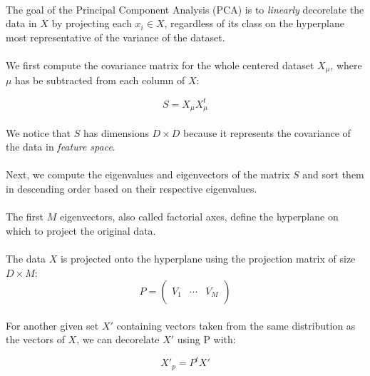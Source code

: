 
\paragraph{}
The goal of the Principal Component Analysis (PCA) is to \emph{linearly} decorelate the data in $X$ by projecting each $x_i \in X$, regardless of its class on the hyperplane most representative of the variance of the dataset.

\paragraph{}
We first compute the covariance matrix for the whole centered dataset $X_\mu$, where $\mu$ has be subtracted from each column of $X$:

$$ S = X_\mu X_\mu ^t$$

\paragraph{}
We notice that $S$ has dimensions $D \times D$ because it represents the covariance of the data in \emph{feature space}.

\paragraph{}
Next, we compute the eigenvalues and eigenvectors of the matrix $S$ and sort them in descending order based on their respective eigenvalues.

\paragraph{}
The first $M$ eigenvectors, also called factorial axes, define the hyperplane on which to project the original data.

\paragraph{}
The data $X$ is projected onto the hyperplane using the projection matrix of size $D \times M$:
$$ P = \left( \begin{array}{ccc}
 &  &  \\
V_1 & \cdots & V_M \\
 &  &  \end{array} \right) $$ 

\paragraph{}
For another given set $X'$ containing vectors taken from the same distribution as the vectors of $X$, we can decorelate $X'$ using P with:

$$ X'_p = P^tX'$$
